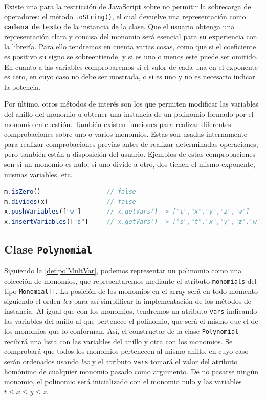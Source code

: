 Existe una para la restricción de JavaScript sobre no permitir la sobrecarga de operadores: el método \texttt{toString()}, el cual devuelve una representación como \textbf{cadena de texto} de la instancia de la clase. Que el usuario obtenga una representación clara y concisa del monomio será esencial para su experiencia con la librería. Para ello tendremos en cuenta varias cosas, como que si el coeficiente es positivo su signo se sobreentiende, y si es uno o menos este puede ser omitido. En cuanto a las variables comprobaremos si el valor de cada una en el exponente es cero, en cuyo caso no debe ser mostrada, o si es uno y no es necesario indicar la potencia.\newline

Por último, otros métodos de interés son los que permiten modificar las variables del anillo del monomio u obtener una instancia de un polinomio formado por el monomio en cuestión. También existen funciones para realizar diferentes comprobaciones sobre uno o varios monomios. Estas son usadas internamente para realizar comprobaciones previas antes de realizar determinadas operaciones, pero también están a disposición del usuario. Ejemplos de estas comprobaciones son si un monomio es nulo, si uno divide a otro, dos tienen el mismo exponente, mismas variables, etc.
\begin{lstlisting}[language=Javascript]
m.isZero()                  // false
m.divides(x)                // false
x.pushVariables(["w"]       // x.getVars() -> ["t","x","y","z","w"]
x.insertVariables(["s"]     // x.getVars() -> ["s","t","x","y","z","w"]
\end{lstlisting}
\subsection{Clase \texttt{Polynomial}}
Siguiendo la \autoref{def:polMultVar}, podemos representar un polinomio como una colección de monomios, que representaremos mediante el atributo \texttt{monomials} del tipo \texttt{Monomial[]}. La posición de los monomios en el array será en todo momento siguiendo el orden \textit{lex} para así simplificar la implementación de los métodos de instancia. Al igual que con los monomios, tendremos un atributo \texttt{vars} indicando las variables del anillo al que pertenece el polinomio, que será el mismo que el de los monomios que lo conforman. Así, el constructor de la clase \texttt{Polynomial} recibirá una lista con las variables del anillo y otra con los monomios. Se comprobará que todos los monomios pertenecen al mismo anillo, en cuyo caso serán ordenados usando \textit{lex} y el atributo \texttt{vars} tomará el valor del atributo homónimo de cualquier monomio pasado como argumento. De no pasarse ningún monomio, el polinomio será inicializado con el monomio nulo y las variables $t\le x\le y \le z$.\newline

